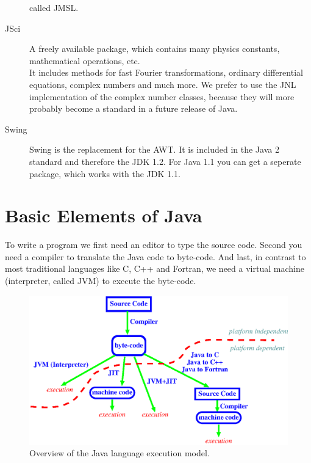 \begin{description}
	called JMSL.
\item[JSci]  A freely available package, which contains many 
  physics constants, mathematical operations, etc. \\
  It includes methods for fast Fourier transformations, ordinary differential 
  equations, complex numbers and much more. We prefer to use the JNL
  implementation of the complex number classes, because they will
  more probably become a standard in a future release of Java.
\item[Swing]  
  Swing is the replacement for the AWT. It is included in the
  Java 2 standard and therefore the JDK 1.2. For Java 1.1 you can get
  a seperate package, which works with the JDK 1.1. 
\end{description}



\section{Basic Elements of Java}
\label{sec:Basic_elements_of_Java}
To write a program we first need an editor
to type the source code. Second you need a compiler to translate
the Java code to byte-code. And last, in contrast to most
traditional languages like C, C++ and Fortran, we need a virtual
machine (interpreter, called JVM) to execute the byte-code.

\begin{figure}[htbp]
  \begin{center}
    \leavevmode
    \includegraphics[width=\textwidth]{../Figures/Java_Overview.eps}
    \caption{Overview of the Java language execution model.}
    \label{fig:Java_Overview}
  \end{center}
\end{figure}


